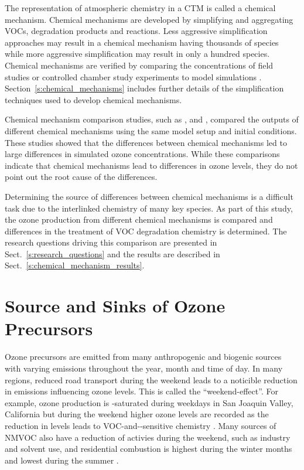 The representation of atmospheric chemistry in a CTM is called a chemical mechanism.
Chemical mechanisms are developed by simplifying and aggregating VOCs, degradation products and reactions.
Less aggressive simplification approaches may result in a chemical mechanism having thousands of species while more aggressive simplification may result in only a hundred species. 
Chemical mechanisms are verified by comparing the concentrations of field studies or controlled chamber study experiments to model simulations \citep{Stockwell:2012}.
Section~\ref{s:chemical_mechanisms} includes further details of the simplification techniques used to develop chemical mechanisms.

Chemical mechanism comparison studies, such as \citet{Kuhn:1998}, \citet{Emmerson:2009} and \citet{Archibald:2010}, compared the outputs of different chemical mechanisms using the same model setup and initial conditions.
These studies showed that the differences between chemical mechanisms led to large differences in simulated ozone concentrations.
While these comparisons indicate that chemical mechanisms lead to differences in ozone levels, they do not point out the root cause of the differences.

Determining the source of differences between chemical mechanisms is a difficult task due to the interlinked chemistry of many key species.
As part of this study, the ozone production from different chemical mechanisms is compared and differences in the treatment of VOC degradation chemistry is determined.
The research questions driving this comparison are presented in Sect.~\ref{s:research_questions} and the results are described in Sect.~\ref{s:chemical_mechanism_results}.

\section{Source and Sinks of Ozone Precursors} \label{s:precursor_emissions}
Ozone precursors are emitted from many anthropogenic and biogenic sources with varying emissions throughout the year, month and time of day.
In many regions, reduced road transport during the weekend leads to a noticible reduction in  emissions influencing ozone levels.
This is called the ``weekend-effect''.
For example, ozone production is -saturated during weekdays in San Joaquin Valley, California but during the weekend higher ozone levels are recorded as the reduction in  levels leads to VOC-and--sensitive chemistry \citep{Pusede:2014}.
Many sources of NMVOC also have a reduction of activies during the weekend, such as industry and solvent use, and residential combustion is highest during the winter months and lowest during the summer \citep{Gon:2011}.

